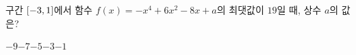 구간 $[-3{,}\mkern3mu\mathopen{}1]$에서 함수 $f(x)=-x^4+6x^2-8x+a$의 최댓값이 $19$일 때, 상수 $a$의 값은?
\begin{choices32}{$-9$}{$-7$}{$-5$}{$-3$}{$-1$}\end{choices32}
